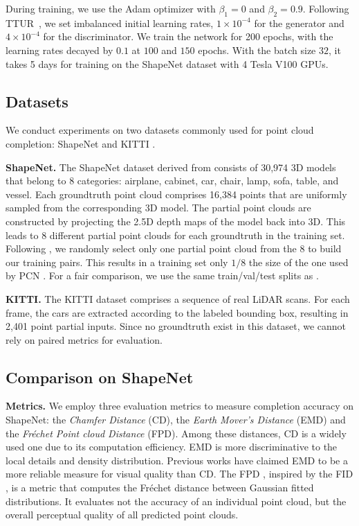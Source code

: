 \documentclass[final]{cvpr}
\begin{document}
During training, we use the Adam optimizer with $\beta_1=0$ and $\beta_2=0.9$. Following TTUR~\cite{heusel2017gans}, we set imbalanced initial learning rates, $1\times 10^{-4}$ for the generator and $4\times 10^{-4}$ for the discriminator. We train the network for 200 epochs, with the learning rates decayed by $0.1$ at $100$ and $150$ epochs. 
With the batch size $32$, it takes 5 days for training on the ShapeNet dataset with 4 Tesla V100 GPUs. 




\subsection{Datasets}
We conduct experiments on two datasets commonly used for point cloud completion: ShapeNet \cite{chang2015shapenet} and KITTI \cite{geiger2013vision}.

\noindent\textbf{ShapeNet.} The ShapeNet dataset derived from \cite{Yuan-2018-pcn} consists of 30,974 3D models that belong to 8 categories: airplane, cabinet, car, chair, lamp, sofa, table, and vessel. Each groundtruth point cloud comprises 16,384 points that are uniformly sampled from the corresponding 3D model. The partial point clouds are constructed by projecting the 2.5D depth maps of the model back into 3D. This leads to 8 different partial point clouds for each groundtruth in the training set.
Following \cite{xie2020grnet,cascaded_2020_CVPR}, we randomly select only one partial point cloud from the 8 to build our training pairs. 
This results in a training set only $1/8$ the size of the one used by PCN \cite{Yuan-2018-pcn}.
For a fair comparison, we use the same train/val/test splits as \cite{xie2020grnet,cascaded_2020_CVPR}.


\noindent\textbf{KITTI.} The KITTI dataset comprises a sequence of real LiDAR scans. 
For each frame, the cars are extracted according to the labeled bounding box, resulting in 2,401 point partial inputs. Since no groundtruth exist in this dataset, we cannot rely on paired metrics for evaluation. 


\subsection{Comparison on ShapeNet}

\noindent\textbf{Metrics.} We employ three evaluation metrics to measure completion accuracy on ShapeNet: the \emph{Chamfer Distance} (CD), the \emph{Earth Mover's Distance} (EMD) and the \emph{Fr\'echet Point cloud Distance} (FPD).
Among these distances, CD is a widely used one due to its computation efficiency. 
EMD is more discriminative to the local details and density distribution. Previous works \cite{liu2019morphing,fan2017pointsetgeneration,achlioptas2018learning} have claimed EMD to be a more reliable measure for visual quality than CD.
The FPD \cite{shu20193d}, inspired by the FID \cite{heusel2017gans}, is a metric that computes the Fr\'echet distance between Gaussian fitted distributions. It evaluates not the accuracy of an individual point cloud, but the overall perceptual quality of all predicted point clouds. 
\end{document}
